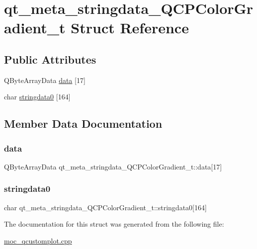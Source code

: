 \hypertarget{structqt__meta__stringdata__QCPColorGradient__t}{}\section{qt\+\_\+meta\+\_\+stringdata\+\_\+\+Q\+C\+P\+Color\+Gradient\+\_\+t Struct Reference}
\label{structqt__meta__stringdata__QCPColorGradient__t}
\subsection*{Public Attributes}
\begin{DoxyCompactItemize}
\item 
Q\+Byte\+Array\+Data \mbox{\hyperlink{structqt__meta__stringdata__QCPColorGradient__t_a4b1142eed666e972a34a24fbcd9338e7}{data}} \mbox{[}17\mbox{]}
\item 
char \mbox{\hyperlink{structqt__meta__stringdata__QCPColorGradient__t_af6991165899703d0e9df570ab79718c3}{stringdata0}} \mbox{[}164\mbox{]}
\end{DoxyCompactItemize}


\subsection{Member Data Documentation}
\mbox{\label{structqt__meta__stringdata__QCPColorGradient__t_a4b1142eed666e972a34a24fbcd9338e7}} 
\subsubsection{\texorpdfstring{data}{data}}
{\footnotesize\ttfamily Q\+Byte\+Array\+Data qt\+\_\+meta\+\_\+stringdata\+\_\+\+Q\+C\+P\+Color\+Gradient\+\_\+t\+::data\mbox{[}17\mbox{]}}

\mbox{\label{structqt__meta__stringdata__QCPColorGradient__t_af6991165899703d0e9df570ab79718c3}} 
\subsubsection{\texorpdfstring{stringdata0}{stringdata0}}
{\footnotesize\ttfamily char qt\+\_\+meta\+\_\+stringdata\+\_\+\+Q\+C\+P\+Color\+Gradient\+\_\+t\+::stringdata0\mbox{[}164\mbox{]}}



The documentation for this struct was generated from the following file\+:\begin{DoxyCompactItemize}
\item 
\mbox{\hyperlink{moc__qcustomplot_8cpp}{moc\+\_\+qcustomplot.\+cpp}}\end{DoxyCompactItemize}
